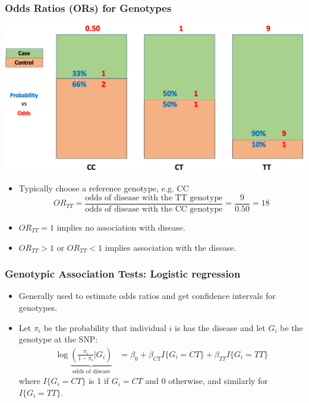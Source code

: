 \documentclass{beamer}
\begin{document}
\begin{frame}
	\frametitle{\bf Odds Ratios (ORs) for Genotypes }
	\centering	\includegraphics[scale=.2]{Figures/odds_plot2.png}
\begin{itemize}
\item Typically choose a reference genotype, e.g. CC
\[ OR_{TT} =\frac{\mbox{odds of disease with the TT genotype}}{\mbox{odds of disease with the CC genotype}} =\frac{9}{0.50} = 18 \]

\item $OR_{TT}=1$ implies no association with disease.  
\item $OR_{TT}>1$ or $OR_{TT}<1$ implies association with the disease.  
 \end{itemize}

\end{frame}


\begin{frame}
	\frametitle{\bf Genotypic Association Tests: Logistic regression }
\begin{itemize}
\item  Generally used to estimate odds ratios and get confidence intervals for genotypes.
\item Let $\pi_i$ be the probability that individual $i$ is has the disease and  let  $G_i$ be the genotype at the SNP:
\begin{align*}
\log\underbrace{\left(\frac{\pi_i}{1-\pi_i}\Big|G_i\right)}_{\text{odds of disease}} &=
\beta _0 + \beta _{CT}I\{G_i=CT\}+\beta_{TT}I\{G_i=TT\}
\end{align*}
 where $I\{G_i=CT\}$ is 1 if $G_i=CT$ and 0 otherwise, and similarly for $I\{G_i=TT\}$.
\end{itemize}
\end{frame}
\end{document}

